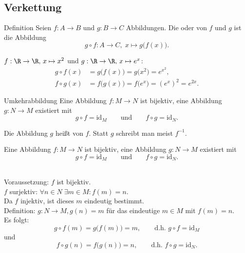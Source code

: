 \subsection{Verkettung}
%
\begin{frame}
	
	\begin{block}{Definition}
		Seien $f: A\to B$ und $g:B\to C$ Abbildungen. 
		Die  oder  von $f$ und $g$ ist die Abbildung
		$$
			g\circ f: A\to C,\; x\mapsto g\big( f(x) \big).
		$$
	\end{block}
	
	\pause
	\vfill
	 $f:\R\to\R,\, x\mapsto x^2$ und $g:\R\to\R,\, x\mapsto e^x$: 
	\begin{align*}
		g\circ f(x) 	&= g\big( f(x) \big) = g\big( x^2 \big) = e^{x^2},\\
		f\circ g(x)	&= f\big( g(x) \big) = f\big( e^x\big) = (e^x)^2 = e^{2x}.
	\end{align*}
	
\end{frame}
%
% 
\begin{frame}
	
	\begin{block}{Umkehrabbildung}
		Eine Abbildung $f: M\to N$ ist  bijektiv,  
		eine Abbildung $g: N \to M$ existiert mit
		$$
			g\circ f = \text{id}_M
			\qquad
			\text{und}
			\qquad
			f\circ g = \text{id}_N.
		$$  
		
		\pause
		\vspace{2mm}
		Die Abbildung $g$ hei{\ss}t  von $f$. Statt $g$ schreibt man meist $f^{-1}$.
	\end{block}
	
\end{frame}
%
% 
\begin{frame}
	
	Eine Abbildung $f: M\to N$ ist  bijektiv,  
	eine Abbildung $g: N \to M$ existiert mit
	$$
		g\circ f = \text{id}_M
		\qquad
		\text{und}
		\qquad
		f\circ g = \text{id}_N.
	$$  
	
	\\ 
	Voraussetzung: $f$ ist bijektiv.\\[1mm]
	$f$ surjektiv: $\forall n\in N\;  \exists m\in M: f(m) = n$.\\
	\pause
	Da $f$ injektiv, ist dieses $m$ eindeutig bestimmt.\\
	\pause
	Definition: $g:N\to M, g(n) = m$ für das eindeutige $m\in M$ mit $f(m) = n$.\\
	\pause
	Es folgt:
	$$
		g\circ f(m) = g\big( f(m) \big) = m, \qquad \text{d.h. } g\circ f = \text{id}_M
	$$
	und
	$$
		f\circ g(n) = f\big( g(n) \big) = n, \qquad \text{d.h. } f\circ g = \text{id}_N.
	$$	
	
\end{frame}
